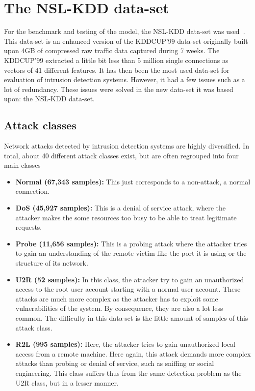 \section{The NSL-KDD data-set}
For the benchmark and testing of the model, the NSL-KDD data-set was used~\cite{Tavallaee:2009:DAK:1736481.1736489,Dhanabal2015AAlgorithms}. This data-set is an enhanced version of the KDDCUP'99 \cite{Stolfo2000Cost-basedExposition,Dua:2017} data-set originally built upon 4GB of compressed raw traffic data captured during 7 weeks. The KDDCUP'99 extracted a little bit less than 5 million single connections as vectors of 41 different features. It has then been the most used data-set for evaluation of intrusion detection systems. However, it had a few issues such as a lot of redundancy. These issues were solved in the new data-set it was based upon: the NSL-KDD data-set.

\subsection{Attack classes}
Network attacks detected by intrusion detection systems are highly diversified. In total, about 40 different attack classes exist, but are often regrouped into four main classes
\begin{itemize}
    \item \textbf{Normal (67,343 samples):} This just corresponds to a non-attack, a normal connection.
    
    \item \textbf{DoS (45,927 samples):} This is a denial of service attack, where the attacker makes the some resources too busy to be able to treat legitimate requests.

    \item \textbf{Probe (11,656 samples):} This is a probing attack where the attacker tries to gain an understanding of the remote victim like the port it is using or the structure of its network.
    
    \item \textbf{U2R (52 samples):} In this class, the attacker try to gain an unauthorized access to the root user account starting with a normal user account. These attacks are much more complex as the attacker has to exploit some vulnerabilities of the system. By consequence, they are also a lot less common. The difficulty in this data-set is the little amount of samples of this attack class.
    
    \item \textbf{R2L (995 samples):} Here, the attacker tries to gain unauthorized local access from a remote machine. Here again, this attack demands more complex attacks than probing or denial of service, such as sniffing or social engineering. This class suffers thus from the same detection problem as the U2R class, but in a lesser manner.
\end{itemize}

